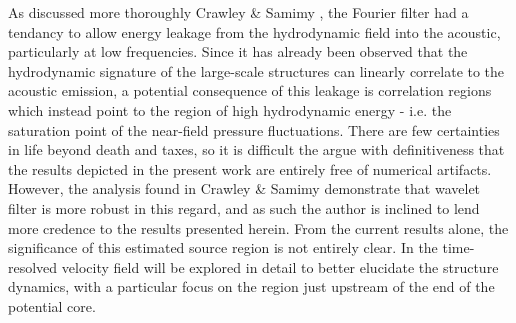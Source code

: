 As discussed more thoroughly Crawley \& Samimy \citep{Crawley2016}, the Fourier filter had a tendancy to allow energy leakage from the hydrodynamic field into the acoustic, particularly at low frequencies. 
Since it has already been observed that the hydrodynamic signature of the large-scale structures can linearly correlate to the acoustic emission, a potential consequence of this leakage is correlation regions which instead point to the region of high hydrodynamic energy - i.e. the saturation point of the near-field pressure fluctuations.
There are few certainties in life beyond death and taxes, so it is difficult the argue with definitiveness that the results depicted in the present work are entirely free of numerical artifacts.
However, the analysis found in Crawley \& Samimy \citep{Crawley2016} demonstrate that wavelet filter is more robust in this regard, and as such the author is inclined to lend more credence to the results presented herein. 
From the current results alone, the significance of this estimated source region is not entirely clear.
In  the time-resolved velocity field will be explored in detail to better elucidate the structure dynamics, with a particular focus on the region just upstream of the end of the potential core.